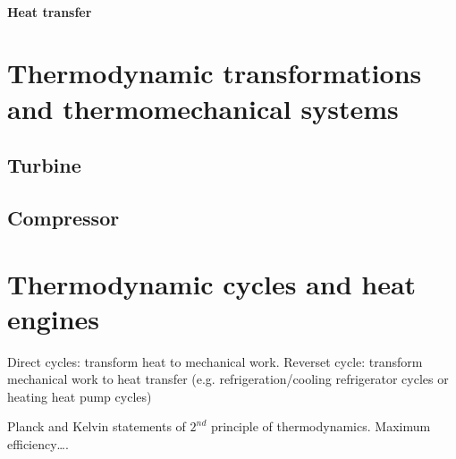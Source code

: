 \documentclass[letterpaper,10pt,english]{jupyterBook}
\begin{document}
\subsubsection*{Heat transfer}

\sphinxstepscope




\chapter{Thermodynamic transformations and thermomechanical systems}
\label{\detokenize{ch/thermodynamic_transformations:thermodynamic-transformations-and-thermomechanical-systems}}\label{\detokenize{ch/thermodynamic_transformations:classical-thermodynamics-transformations}}\label{\detokenize{ch/thermodynamic_transformations::doc}}

\section{Turbine}
\label{\detokenize{ch/thermodynamic_transformations:turbine}}\label{\detokenize{ch/thermodynamic_transformations:classical-thermodynamics-transformations-turbine}}

\section{Compressor}
\label{\detokenize{ch/thermodynamic_transformations:compressor}}\label{\detokenize{ch/thermodynamic_transformations:classical-thermodynamics-transformations-compressor}}
\sphinxstepscope




\chapter{Thermodynamic cycles and heat engines}
\label{\detokenize{ch/heat-engines:thermodynamic-cycles-and-heat-engines}}\label{\detokenize{ch/heat-engines:classical-thermodynamics-heat-engines}}\label{\detokenize{ch/heat-engines::doc}}
\sphinxAtStartPar
{} Direct cycles: transform heat to mechanical work. Reverset cycle: transform mechanical work to heat transfer (e.g. refrigeration/cooling \sphinxhyphen{} refrigerator cycles \sphinxhyphen{} or heating \sphinxhyphen{} heat pump cycles)

\sphinxAtStartPar
{} Planck and Kelvin statements of \(2^{nd}\) principle of thermodynamics. Maximum efficiency….
\end{document}
